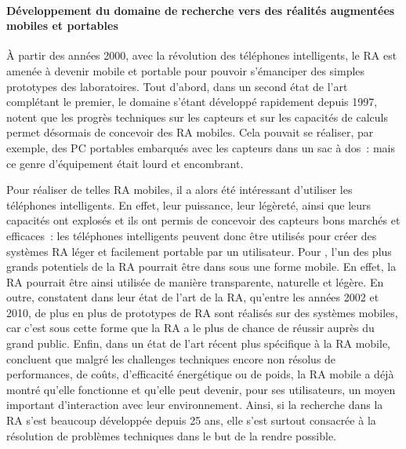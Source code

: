 
\paragraph*{Développement du domaine de recherche vers des réalités augmentées mobiles et portables}
À partir des années 2000, avec la révolution des téléphones intelligents, le RA est amenée à devenir mobile et portable pour pouvoir s'émanciper des simples prototypes des laboratoires. Tout d'abord, dans un second état de l'art complétant le premier, le domaine s'étant développé rapidement depuis 1997, \citet{AzumaBaillotBehringerEtAl2001} notent que les progrès techniques sur les capteurs et sur les capacités de calculs permet désormais de concevoir des RA mobiles. Cela pouvait se réaliser, par exemple, des PC portables embarqués avec les capteurs dans un sac à dos~: mais ce genre d'équipement était lourd et encombrant. \citep{DeSaChurchill2013}

Pour réaliser de telles RA mobiles, il a alors été intéressant d'utiliser les téléphones intelligents. En effet, leur puissance, leur légèreté, ainsi que leurs capacités ont explosés et ils ont permis de concevoir des capteurs bons marchés et efficaces~: les téléphones intelligents peuvent donc être utilisés pour créer des systèmes RA léger et facilement portable par un utilisateur. \citep{ZhouDuhBillinghurst2008} \citep{DeSaChurchill2013} Pour \citet{VanKrevelenPoelman2010}, l'un des plus grands potentiels de la RA pourrait être dans sous une forme mobile. En effet, la RA pourrait être ainsi utilisée de manière transparente, naturelle et légère. En outre, \citet{CarmignianiFurhtAnisettiEtAl2011} constatent dans leur état de l'art de la RA, qu'entre les années 2002 et 2010, de plus en plus de prototypes de RA sont réalisés sur des systèmes mobiles, car c'est sous cette forme que la RA a le plus de chance de réussir auprès du grand public. Enfin, dans un état de l'art récent plus spécifique à la RA mobile, \citet{HuangHuiPeyloEtAl2013} concluent que malgré les challenges techniques encore non résolus de performances, de coûts, d'efficacité énergétique ou de poids, la RA mobile a déjà montré qu'elle fonctionne et qu'elle peut devenir, pour ses utilisateurs, un moyen important d’interaction avec leur environnement. Ainsi, si la recherche dans la RA s'est beaucoup développée depuis 25 ans, elle s'est surtout consacrée à la résolution de problèmes techniques dans le but de la rendre possible.



